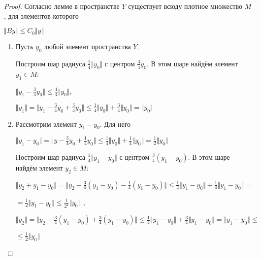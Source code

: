 \documentclass[12pt,a4paper,titlepage,oneside]{book}
\theoremstyle{definition}
\theoremstyle{plain}
\theoremstyle{break}
\theoremstyle{remark}
\theoremstyle{remark}
\theoremstyle{remark}
\theoremstyle{remark}
\theoremstyle{plain}
\theoremstyle{plain}
\begin{document}
\begin{proof}
Согласно лемме в пространстве $Y$ существует всюду плотное множество $M$, для элементов которого
\begin{center}
	$\Vert By \Vert \leqslant C_0 \Vert y \Vert $
\end{center}
\begin{enumerate}

	\item Пусть $y_0$ любой элемент пространства $Y$.
	
	Построим шар радиуса $\frac{1}{4}\Vert y_0 \Vert$ с 		центром $\frac{3}{4}y_0$. В этом шаре найдём элемент
	$y_1 \in M$:
	\begin{center}
	$\Vert y_1 - \frac{3}{4}y_0\Vert \leqslant \frac{1}{4}    		\Vert y_0 \Vert $,
	\end{center}
	\begin{center}
	$\Vert y_1 \Vert =
	\Vert y_1 - \frac{3}{4}y_0 +
	\frac{3}{4}y_0 \Vert \leqslant \frac{1}{4} 			\Vert y_0 \Vert +
	 \frac{3}{4}\Vert y_0\Vert = 				\Vert y_0 \Vert$
	\end{center}
	
	\item Рассмотрим элемент $y_1 - y_0$. Для него
	\begin{center}
	$\Vert y_1-y_0 \Vert =\Vert y - \frac{3}{4}y_0 +
	\frac{1}{4}y_0 \Vert \leqslant
	\frac{1}{4} \Vert y_0 \Vert +
	\frac{1}{4} \Vert y_0 \Vert =
	\frac{1}{2} \Vert y_0 \Vert$
	\end{center}
	Построим шар радиуса $\frac{1}{4} \Vert 		y_1 - y_0 \Vert$ с центром $\frac{3}{4} (y_1 - y_0)$. В этом шаре найдём элемент $y_2 \in M$:
	\begin{center}
	$\Vert y_2 + y_1 - y_0 \Vert =
	\Vert y_2 - \frac{3}{4}(y_1 - y_0) -
	\frac{1}{4}(y_1 - y_0) \Vert \leqslant
	\frac{1}{4} \Vert y_1 - y_0 \Vert +
	\frac{1}{4} \Vert y_1 - y_0 \Vert = $
	\end{center}
	\begin{center}
	$ = \frac{1}{2} \Vert y_1 - y_0 \Vert 			\leqslant
	\frac{1}{2^2} \Vert y_0 \Vert$ ,
	\end{center}
	\begin{center}
	$\Vert y_2 \Vert =
	\Vert y_2 - \frac{3}{4}(y_1 - y_0) +
	\frac{3}{4}(y_1 - y_0) \Vert \leqslant
	\frac{1}{4} \Vert y_1 - y_0 \Vert +
	\frac{3}{4} \Vert y_1 - y_0 \Vert =
	 \Vert y_1 - y_0 \Vert \leqslant$
	 \end{center}
	\begin{center}
	 $ \leqslant \frac{1}{2} \Vert y_0 \Vert$
	\end{center}
	

\end{enumerate}
\end{proof}
\end{document}
